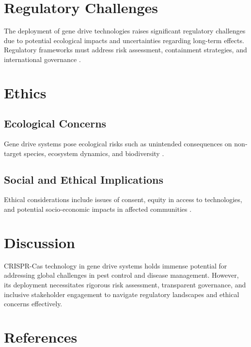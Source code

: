 \documentclass[12pt]{article}
\begin{document}
\section{Regulatory Challenges}
The deployment of gene drive technologies raises significant regulatory challenges due to potential ecological impacts and uncertainties regarding long-term effects. Regulatory frameworks must address risk assessment, containment strategies, and international governance \citep{eccleston2019regulation, oye2014biotechnology}.

\section{Ethics}
\subsection{Ecological Concerns}
Gene drive systems pose ecological risks such as unintended consequences on non-target species, ecosystem dynamics, and biodiversity \citep{esvelt2014concerning, nordmann2015governance}.

\subsection{Social and Ethical Implications}
Ethical considerations include issues of consent, equity in access to technologies, and potential socio-economic impacts in affected communities \citep{nuffield2016genedrive, dirocco2019ethical}.

\section{Discussion}
CRISPR-Cas technology in gene drive systems holds immense potential for addressing global challenges in pest control and disease management. However, its deployment necessitates rigorous risk assessment, transparent governance, and inclusive stakeholder engagement to navigate regulatory landscapes and ethical concerns effectively.

\section*{References}


\end{document}
